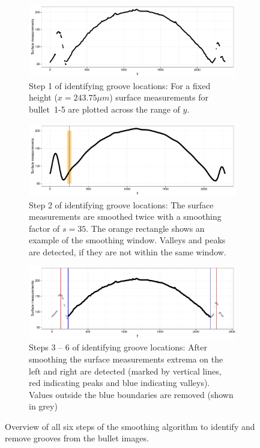 \documentclass[aoas, preprint]{imsart}\usepackage[]{graphicx}\usepackage[]{color}
\newenvironment{knitrout}{}{} %
\begin{document}
\begin{figure}[hbtp]
  \centering
\begin{subfigure}[t]{\textwidth}\centering
\caption{\label{fig:loess_step1}Step 1 of identifying groove locations: For a fixed height ($x = 243.75\mu m$)  surface measurements for bullet~1-5 are plotted across the range of $y$.}
\begin{knitrout}
\color{fgcolor}
\includegraphics[width=.5\textwidth]{loess_step1-1} 

\end{knitrout}
\end{subfigure}
\begin{subfigure}[t]{\textwidth}\centering
\caption{\label{fig:loess_step3}Step 2 of identifying groove locations: The  surface measurements are smoothed twice with a smoothing factor of $s = 35$. The orange rectangle shows an example of the smoothing window. Valleys and peaks are detected, if they are not within the same window.}
\begin{knitrout}
\color{fgcolor}
\includegraphics[width=.5\textwidth]{loess_step3-1} 

\end{knitrout}
\end{subfigure}
\begin{subfigure}[t]{\textwidth}\centering
\caption{\label{fig:loess_step47}Steps 3 -- 6 of identifying groove locations: After smoothing the surface measurements extrema on the left and right are detected (marked by vertical lines, red indicating peaks and blue indicating valleys). Values outside the blue boundaries are removed (shown in grey)}
\begin{knitrout}
\color{fgcolor}
\includegraphics[width=.5\textwidth]{loess_step47-1} 

\end{knitrout}
\end{subfigure}
\caption{Overview of all six steps of the smoothing algorithm to identify and remove grooves from the bullet images.}
\end{figure}
\end{document}
